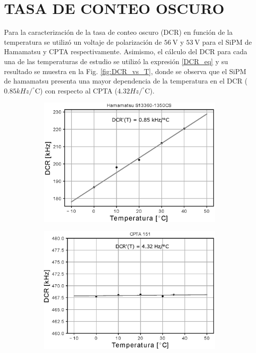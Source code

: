 \section{TASA DE CONTEO OSCURO}
Para la caracterización de la tasa de conteo oscuro (DCR) en función de la temperatura se utilizó un voltaje de polarización de $56~\mbox{V}$ y $53 ~\mbox{V}$ para el SiPM de Hamamatsu y CPTA respectivamente. Asimismo, el cálculo del DCR para cada una de las temperaturas de estudio se utilizó la expresión \ref{DCR_eq} y su resultado se muestra en la Fig. \ref{fig:DCR_vs_T}, donde se observa que el SiPM de hamamatsu presenta una mayor dependencia de la temperatura en el DCR ($0.85 kHz/ ^\circ$C) con respecto al CPTA ($4.32 Hz/ ^\circ$C). 
\begin{figure}[h!]
     \centering
        \caption{Tasa de conteo oscuro en función de la temperatura para los SiPM S13360-1350CS de Hamamatsu (izquierda) y CPTA 151 (derecha). La razón de cambio del DCR es $0.85 kHz/ ^\circ$C para el SiPM de Hamamatsu y  $4.32 Hz/ ^\circ$C para el CPTA.}
     \begin{subfigure}[b]{0.49\textwidth}
         \centering
         \includegraphics[width=1.1\textwidth]{Images/DCR_T_1350CS.eps}
         \label{fig:DCR_T_1350CS}
     \end{subfigure}
     \begin{subfigure}[b]{0.49\textwidth}
         \centering
         \includegraphics[width=1.1\textwidth]{Images/DCR_T_CPTA.eps}

\end{subfigure}
\end{figure}
